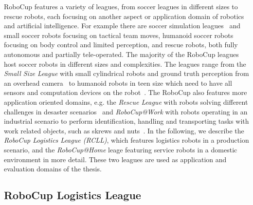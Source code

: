 RoboCup features a variety of leagues, from soccer leagues in
different sizes to rescue robots, each focusing on another aspect or
application domain of robotics and artificial intelligence.  For
example there are soccer simulation leagues~\cite{simspark_old} and
small soccer robots focusing on tactical team moves, humanoid soccer
robots focusing on body control and limited perception, and rescue
robots, both fully autonomous and partially tele-operated. The
majority of the RoboCup leagues host soccer robots in different sizes
and complexities. The leagues range from the \emph{Small Size League}
with small cylindrical robots and ground truth perception from an
overhead camera~\cite{rc-ssl} to humanoid robots in teen size which
need to have all sensors and computation devices on the
robot~\cite{rc-book}. The RoboCup also features more application
oriented domains, e.g. the \emph{Rescue League} with robots solving
different challenges in desaster scenarios~\cite{rc-rescue} and
\emph{RoboCup@Work} with robots operating in an industrial scenario to
perform identification, handling and transporting tasks with work
related objects, such as skrews and nuts~\cite{rc-work}. In the
following, we describe the \emph{RoboCup Logistics League (RCLL)},
which features logistics robots in a production scenario, and the
\emph{RoboCup@Home} leage featuring service robots in a domestic
environment in more detail. These two leagues are used as application
and evaluation domains of the thesis.

\subsection{RoboCup Logistics League}


